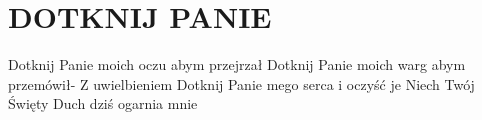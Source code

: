 \documentclass[../../../songbook.tex]{subfiles}
\begin{document}
\TabPositions{8cm} %
\section*{DOTKNIJ PANIE}
{}
\vspace{0.5cm}
Dotknij Panie moich oczu abym przejrzał		 \newline	
Dotknij Panie moich warg abym przemówił-  \newline
Z uwielbieniem \newline
Dotknij Panie mego serca i oczyść je \newline
Niech Twój Święty Duch dziś ogarnia mnie \newline
\end{document}
